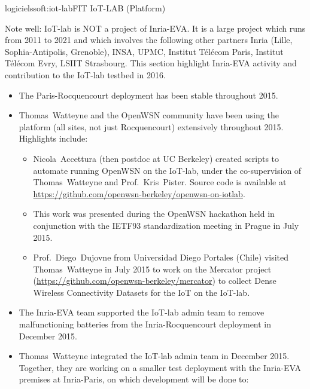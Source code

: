\documentclass{ra2016}
\begin{document}
\begin{module}{logiciels}{soft:iot-lab}{FIT IoT-LAB (Platform)} 

\begin{participants}
\end{participants}

Note well: IoT-lab is NOT a project of Inria-EVA.
It is a large project which runs from 2011 to 2021 and which involves the following other partners Inria (Lille, Sophia-Antipolis, Grenoble), INSA, UPMC, Institut T\'el\'ecom Paris, Institut T\'el\'ecom Evry, LSIIT Strasbourg.
This section highlight Inria-EVA activity and contribution to the IoT-lab testbed in 2016.

\begin{itemize}
    \item The Paris-Rocquencourt deployment has been stable throughout 2015.
    \item Thomas~Watteyne and the OpenWSN community have been using the platform (all sites, not just Rocquencourt) extensively throughout 2015. Highlights include:
    \begin{itemize}
        \item Nicola~Accettura (then postdoc at UC Berkeley) created scripts to automate running OpenWSN on the IoT-lab, under the co-supervision of Thomas~Watteyne and Prof.~Kris~Pister.
            Source code is available at \url{https://github.com/openwsn-berkeley/openwsn-on-iotlab}.
        \item This work was presented during the OpenWSN hackathon held in conjunction with the IETF93 standardization meeting in Prague in July 2015.
        \item Prof.~Diego~Dujovne from Universidad Diego Portales (Chile) visited Thomas~Watteyne in July 2015 to work on the Mercator project (\url{https://github.com/openwsn-berkeley/mercator}) to collect Dense Wireless Connectivity Datasets for the IoT on the IoT-lab.
    \end{itemize}
    \item The Inria-EVA team supported the IoT-lab admin team to remove malfunctioning batteries from the Inria-Rocquencourt deployment in December 2015.
    \item Thomas~Watteyne integrated the IoT-lab admin team in December 2015. Together, they are working on a smaller test deployment with the Inria-EVA premises at Inria-Paris, on which development will be done to:

\end{itemize}
\end{module}
\end{document}
